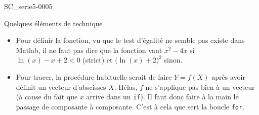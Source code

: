\begin{corrige}{SC_serie5-0005}

	Quelques éléments de technique
	\begin{itemize}
		\item 
			Pour définir la fonction, vu que le test d'égalité ne semble pas existe dans Matlab, il ne faut pas dire que la fonction vaut $x^2-4x$ si $\ln(x)-x+2<0$ (strict) et $\big( \ln(x)+2 \big)^2$ sinon.
		\item
			Pour tracer, la procédure habituelle serait de faire $Y=f(X)$ après avoir définit un vecteur d'abscisses $X$. Hélas, $f$ ne s'applique pas bien à un vecteur (à cause du fait que $x$ arrive dans un \verb+if+). Il faut donc faire à la main le passage de composante à composante. C'est à cela que sert la boucle \verb+for+.
	\end{itemize}
	


\end{corrige}

